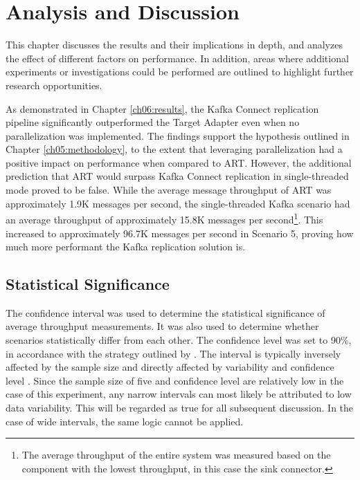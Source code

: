 \chapter{Analysis and Discussion}
\label{ch07:discussion}
This chapter discusses the results and their implications in depth, and analyzes the effect of different factors on performance. In addition, areas where additional experiments or investigations could be performed are outlined to highlight further research opportunities.

As demonstrated in Chapter \ref{ch06:results}, the Kafka Connect replication pipeline significantly outperformed the Target Adapter even when no parallelization was implemented. The findings support the hypothesis outlined in Chapter \ref{ch05:methodology}, to the extent that leveraging parallelization had a positive impact on performance when compared to \ac{ART}. However, the additional prediction that \ac{ART} would surpass Kafka Connect replication in single-threaded mode proved to be false. While the average message throughput of \ac{ART} was approximately 1.9K messages per second, the single-threaded Kafka scenario had an average throughput of approximately 15.8K messages per second\footnote{The average throughput of the entire system was measured based on the component with the lowest throughput, in this case the sink connector.}. This increased to approximately 96.7K messages per second in Scenario 5, proving how much more performant the Kafka replication solution is.

\section{Statistical Significance}
\label{ch07:discussion:statsig}
The confidence interval was used to determine the statistical significance of average throughput measurements. It was also used to determine whether scenarios statistically differ from each other. The confidence level was set to 90\%, in accordance with the strategy outlined by \citeauthor{jain1991computer} \cite{jain1991computer}. The interval is typically inversely affected by the sample size and directly affected by variability and confidence level \cite{hazrausingci}. Since the sample size of five and confidence level are relatively low in the case of this experiment, any narrow intervals can most likely be attributed to low data variability. This will be regarded as true for all subsequent discussion. In the case of wide intervals, the same logic cannot be applied.


